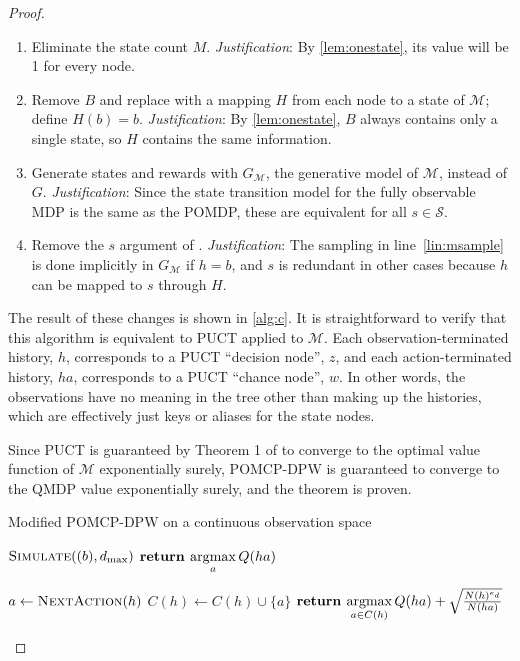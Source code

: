 \begin{proof}
    \begin{enumerate}
        \item Eliminate the state count $M$. \emph{Justification}: By \cref{lem:onestate}, its value will be 1 for every node.
        \item Remove $B$ and replace with a mapping $H$ from each node to a state of $\mathcal{M}$; define $H(b) = b$. \emph{Justification}: By \cref{lem:onestate}, $B$ always contains only a single state, so $H$ contains the same information.
        \item Generate states and rewards with $G_\mathcal{M}$, the generative model of $\mathcal{M}$, instead of $G$. \emph{Justification}: Since the state transition model for the fully observable MDP is the same as the POMDP, these are equivalent for all $s \in \mathcal{S}$.
        \item Remove the $s$ argument of . \emph{Justification}: The sampling in line~\ref{lin:msample} is done implicitly in $G_\mathcal{M}$ if $h=b$, and $s$ is redundant in other cases because $h$ can be mapped to $s$ through $H$.
    \end{enumerate}

    The result of these changes is shown in \cref{alg:c}. It is straightforward to verify that this algorithm is equivalent to PUCT applied to $\mathcal{M}$.
    Each observation-terminated history, $h$, corresponds to a PUCT ``decision node'', $z$, and each action-terminated history, $ha$, corresponds to a PUCT ``chance node'', $w$.
    In other words, the observations have no meaning in the tree other than making up the histories, which are effectively just keys or aliases for the state nodes.
    
    Since PUCT is guaranteed by Theorem 1 of \citet{auger2013continuous} to converge to the optimal value function of $\mathcal{M}$ exponentially surely, POMCP-DPW is guaranteed to converge to the QMDP value exponentially surely, and the theorem is proven.

\begin{algorithm}[htb]
    \caption{Modified POMCP-DPW on a continuous observation space} \label{alg:c}
    \begin{algorithmic}[1]
                \State $\Call{Simulate}{(b), d_\text{max}}$
            \EndFor
            \State $\textbf{return } \underset{a}{\argmax}\, Q(ha)$
        \EndProcedure

                \State $a \gets \Call{NextAction}{h}$
                \State $C(h) \gets C(h) \cup \{a\}$
            \EndIf
            \State $\textbf{return } \underset{a \in C(h)}{\argmax}\, Q(ha) + \sqrt{\frac{N(h)^{e_d}}{N(ha)}}$
        \EndProcedure


\end{algorithmic}
\end{algorithm}
\end{proof}
